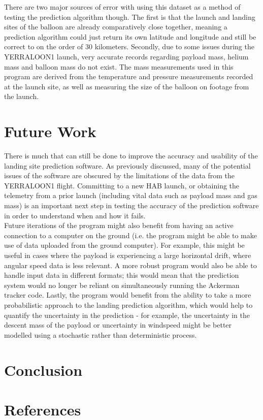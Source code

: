 \documentclass[11pt]{article}
\begin{document}
There are two major sources of error with using this dataset as a method of testing the prediction algorithm though. The first is that the launch and landing sites of the balloon are already comparatively close together, meaning a prediction algorithm could just return its own latitude and longitude and still be correct to on the order of 30 kilometers. Secondly, due to some issues during the YERRALOON1 launch, very accurate records regarding payload mass, helium mass and balloon mass do not exist. The mass measurements used in this program are derived from the temperature and pressure measurements recorded at the launch site, as well as measuring the size of the balloon on footage from the launch. 

\section{Future Work}

There is much that can still be done to improve the accuracy and usability of the landing site prediction software. As previously discussed, many of the potential issues of the software are obscured by the limitations of the data from the YERRALOON1 flight. Committing to a new HAB launch, or obtaining the telemetry from a prior launch (including vital data such as payload mass and gas mass) is an important next step in testing the accuracy of the prediction software in order to understand when and how it fails. \\

Future iterations of the program might also benefit from having an active connection to a computer on the ground (i.e. the program might be able to make use of data uploaded from the ground computer). For example, this might be useful in cases where the payload is experiencing a large horizontal drift, where angular speed data is less relevant. A more robust program would also be able to handle input data in different formats; this would mean that the prediction system would no longer be reliant on simultaneously running the Ackerman tracker code. Lastly, the program would benefit from the ability to take a more probabilistic approach to the landing prediction algorithm, which would help to quantify the uncertainty in the prediction - for example, the uncertainty in the descent mass of the payload or uncertainty in windspeed might be better modelled using a stochastic rather than deterministic process.

\section{Conclusion}

\newpage

\section{References}
\end{document}
